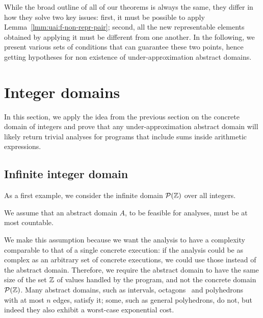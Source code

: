 While the broad outline of all of our theorems is always the same, they differ in how they solve two key issues: first, it must be possible to apply Lemma~\ref{lmm:uai:f-non-repr-pair}; second, all the new representable elements obtained by applying it must be different from one another. In the following, we present various sets of conditions that can guarantee these two points, hence getting hypotheses for non existence of under-approximation abstract domains.

\section{Integer domains}\label{sec:uai:integer}
In this section, we apply the idea from the previous section on the concrete domain of integers and prove that any under-approximation abstract domain will likely return trivial analyses for programs that include sums inside arithmetic expressions.

\subsection{Infinite integer domain}\label{sec:uai:integers-infinite}
As a first example, we consider the infinite domain $\mathcal{P}(\mathbb{Z})$ over all integers.
\begin{assump}\label{assump:uai:size-A-infinite-integers}
	We assume that an abstract domain $A$, to be feasible for analyses, must be at most countable.
\end{assump}
We make this assumption because we want the analysis to have a complexity comparable to that of a single concrete execution: if the analysis could be as complex as an arbitrary set of concrete executions, we could use those instead of the abstract domain. Therefore, we require the abstract domain to have the same size of the set $\mathbb{Z}$ of values handled by the program, and not the concrete domain $\mathcal{P}(\mathbb{Z})$. Many abstract domains, such as intervals, octagons~\cite{Mine06} and polyhedrons~\cite{CH78} with at most $n$ edges, satisfy it; some, such as general polyhedrons, do not, but indeed they also exhibit a worst-case exponential cost.

